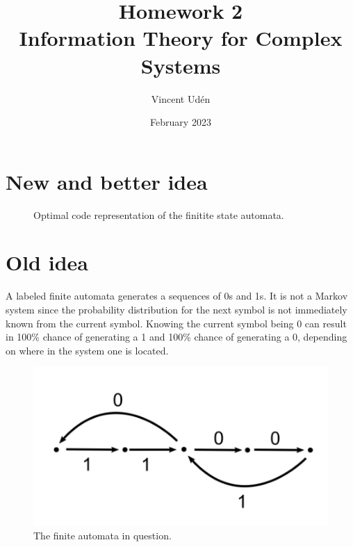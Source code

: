 \documentclass[a4paper, 12pt]{article}
\begin{document}
\title{\textbf{Homework 2}\\ \Large Information Theory for Complex Systems}
\author{Vincent Udén}
\date{February 2023}

\maketitle

\section{New and better idea}

\begin{figure}[ht]
\begin{center}
    \caption{Optimal code representation of the finitite state automata.}
\end{center}

\end{figure}

\section{Old idea}

A labeled finite automata generates a sequences of 0s and 1s. It is not a Markov system since the probability distribution for the next symbol is not immediately known from the current symbol. Knowing the current symbol being 0 can result in 100\% chance of generating a 1 and 100\% chance of generating a 0, depending on where in the system one is located.

\begin{figure}[ht]
    \begin{center}
    \includegraphics[width=0.5 \linewidth]{fig.png}
    \caption{The finite automata in question.}
    \end{center}
\end{figure}
\end{document}
